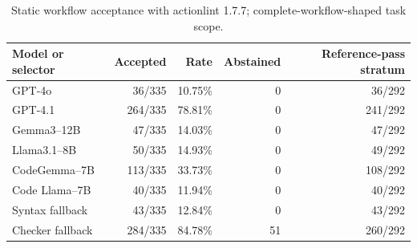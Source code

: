 \begin{table}[H]
\centering\small
\caption{Static workflow acceptance with actionlint 1.7.7; complete-workflow-shaped task scope.}
\label{tab:workflow}
\begin{tabular}{@{}lrrrr@{}}
\toprule
Model or selector & Accepted & Rate & Abstained & Reference-pass stratum\\
\midrule
GPT-4o & 36/335 & 10.75\% & 0 & 36/292\\
GPT-4.1 & 264/335 & 78.81\% & 0 & 241/292\\
Gemma3--12B & 47/335 & 14.03\% & 0 & 47/292\\
Llama3.1--8B & 50/335 & 14.93\% & 0 & 49/292\\
CodeGemma--7B & 113/335 & 33.73\% & 0 & 108/292\\
Code Llama--7B & 40/335 & 11.94\% & 0 & 40/292\\
Syntax fallback & 43/335 & 12.84\% & 0 & 43/292\\
Checker fallback & 284/335 & 84.78\% & 51 & 260/292\\
\bottomrule
\end{tabular}
\par\vspace{0.3em}{\footnotesize All 335 tasks remain in the main denominator. References themselves pass in 292 cases. The last column uses only that separately defined 292-task stratum. All generated exact-text matches are zero in both strata; acceptance is a static check.}
\end{table}
